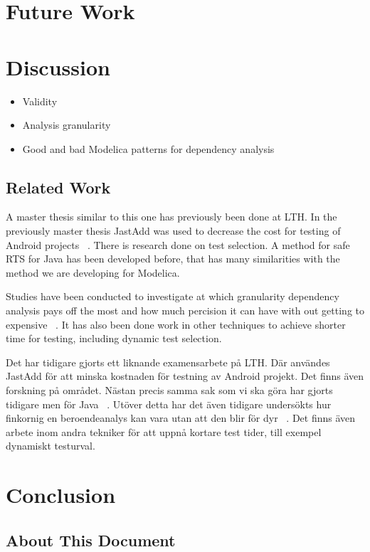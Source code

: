 \documentclass{cslthse-msc}
\begin{document}
\chapter[Future Work]{Future Work}
	
\chapter[Discussion]{Discussion}



\begin{itemize}
	\item Validity
	\item Analysis granularity
    \item Good and bad Modelica patterns for dependency analysis
\end{itemize}

\section{Related Work}

A master thesis similar to this one has previously been done at LTH. In the previously master thesis JastAdd was used to decrease the cost for testing of Android projects ~\cite{kampe2012dependroid}. There is research done on test selection. A method for safe RTS for Java has been developed before, that has many similarities with the method we are developing for Modelica. 

Studies have been conducted to investigate at which granularity dependency analysis pays off the most and how much percision it can have with out getting to expensive ~\cite{DBLP:conf/sigsoft/LegunsenHSLZM16}. It has also been done work in other techniques to achieve shorter time for testing, including dynamic test selection.

Det har tidigare gjorts ett liknande examensarbete på LTH. Där användes JastAdd för att minska kostnaden för testning av Android projekt. Det finns även forskning på området. Nästan precis samma sak som vi ska göra har gjorts tidigare men för Java ~\cite{DBLP:conf/pppj/OqvistHM16}. Utöver detta har det även tidigare undersökts hur finkornig en beroendeanalys kan vara utan att den blir för dyr ~\cite{DBLP:conf/sigsoft/LegunsenHSLZM16}. Det finns även arbete inom andra tekniker för att uppnå kortare test tider, till exempel dynamiskt testurval.
\chapter[Conclusion]{Conclusion}

\begin{appendices}
\chapter{About This Document}
\end{appendices}
\end{document}
